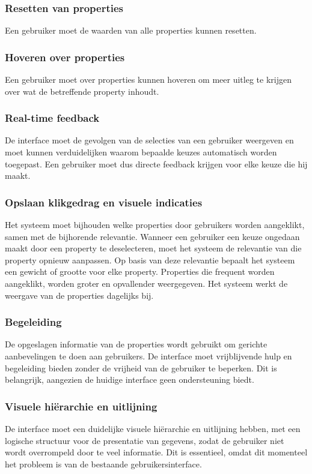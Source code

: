 \subsubsection{Resetten van properties}
Een gebruiker moet de waarden van alle properties kunnen resetten.

\subsubsection{Hoveren over properties}
Een gebruiker moet over properties kunnen hoveren om meer uitleg te krijgen over wat de betreffende property inhoudt.

\subsubsection{Real-time feedback}
De interface moet de gevolgen van de selecties van een gebruiker weergeven en moet kunnen verduidelijken waarom bepaalde keuzes automatisch worden toegepast. Een gebruiker moet dus directe feedback krijgen voor elke keuze die hij maakt.

\subsubsection{Opslaan klikgedrag en visuele indicaties}
Het systeem moet bijhouden welke properties door gebruikers worden aangeklikt, samen met de bijhorende relevantie. Wanneer een gebruiker een keuze ongedaan maakt door een property te deselecteren, moet het systeem de relevantie van die property opnieuw aanpassen. Op basis van deze relevantie bepaalt het systeem een gewicht of grootte voor elke property. Properties die frequent worden aangeklikt, worden groter en opvallender weergegeven. Het systeem werkt de weergave van de properties dagelijks bij.
\subsubsection{Begeleiding}
De opgeslagen informatie van de properties wordt gebruikt om gerichte aanbevelingen te doen aan gebruikers. De interface moet vrijblijvende hulp en begeleiding bieden zonder de vrijheid van de gebruiker te beperken. Dit is belangrijk, aangezien de huidige interface geen ondersteuning biedt.

\subsubsection{Visuele hiërarchie en uitlijning}
De interface moet een duidelijke visuele hiërarchie en uitlijning hebben, met een logische structuur voor de presentatie van gegevens, zodat de gebruiker niet wordt overrompeld door te veel informatie. Dit is essentieel, omdat dit momenteel het probleem is van de bestaande gebruikersinterface.

